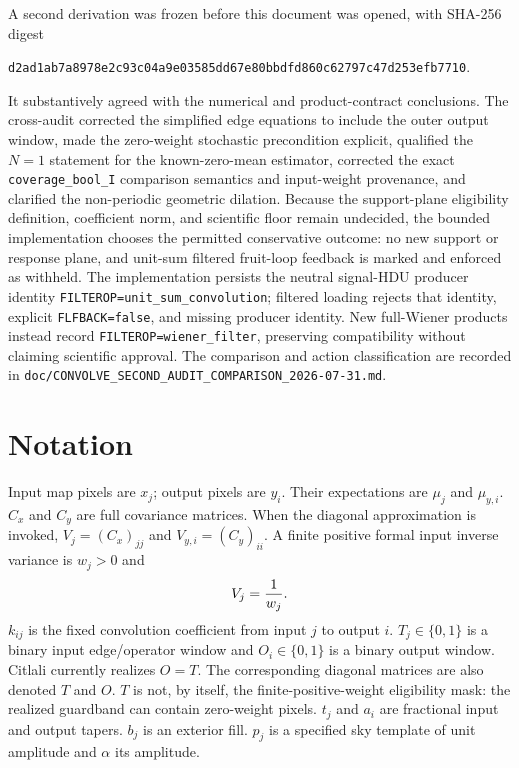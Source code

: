 \documentclass[11pt]{article}
\newcommand{\code}[1]{\nolinkurl{#1}}
\begin{document}
A second derivation was frozen before this document was opened, with SHA-256
digest
\begin{center}
\small\code{d2ad1ab7a8978e2c93c04a9e03585dd67e80bbdfd860c62797c47d253efb7710}.
\end{center}
It substantively agreed with the numerical and product-contract conclusions.
The cross-audit corrected the simplified edge equations to include the outer
output window, made the zero-weight stochastic precondition explicit,
qualified the $N=1$ statement for the known-zero-mean estimator, corrected
the exact \code{coverage_bool_I} comparison semantics and input-weight
provenance, and clarified the non-periodic geometric dilation.  Because the
support-plane eligibility definition, coefficient norm, and scientific floor
remain undecided, the bounded implementation chooses the permitted
conservative outcome: no
new support or response plane, and unit-sum filtered fruit-loop feedback is
marked and enforced as withheld.  The implementation persists the neutral
signal-HDU producer identity \code{FILTEROP=unit_sum_convolution}; filtered
loading rejects that identity, explicit \code{FLFBACK=false}, and missing
producer identity.  New full-Wiener products instead record
\code{FILTEROP=wiener_filter}, preserving compatibility without claiming
scientific approval.  The comparison and action classification
are recorded in
\code{doc/CONVOLVE_SECOND_AUDIT_COMPARISON_2026-07-31.md}.

\section{Notation}
\label{sec:notation}

Input map pixels are $x_j$; output pixels are $y_i$.  Their expectations are
$\mu_j$ and $\mu_{y,i}$.  $C_x$ and $C_y$ are full covariance matrices.
When the diagonal approximation is invoked, $V_j=(C_x)_{jj}$ and
$V_{y,i}=(C_y)_{ii}$.  A finite positive formal input inverse variance is
$w_j>0$ and
\begin{equation}
 V_j={1\over w_j}.
 \label{eq:input-weight-to-var}
\end{equation}
$k_{ij}$ is the fixed convolution coefficient from input $j$ to output $i$.
$T_j\in\{0,1\}$ is a binary input edge/operator window and
$O_i\in\{0,1\}$ is a binary output window.  Citlali currently realizes
$O=T$.  The corresponding diagonal matrices are also denoted $T$ and $O$.
$T$ is not, by itself, the finite-positive-weight eligibility mask: the
realized guardband can contain zero-weight pixels.
$t_j$ and $a_i$ are fractional input and output tapers.  $b_j$ is an exterior
fill.  $p_j$ is a specified sky template of unit amplitude and $\alpha$ its
amplitude.
\end{document}

